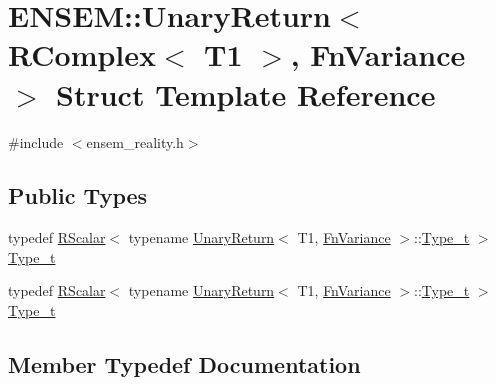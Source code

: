 \hypertarget{structENSEM_1_1UnaryReturn_3_01RComplex_3_01T1_01_4_00_01FnVariance_01_4}{}\section{E\+N\+S\+EM\+:\+:Unary\+Return$<$ R\+Complex$<$ T1 $>$, Fn\+Variance $>$ Struct Template Reference}
\label{structENSEM_1_1UnaryReturn_3_01RComplex_3_01T1_01_4_00_01FnVariance_01_4}


{\ttfamily \#include $<$ensem\+\_\+reality.\+h$>$}

\subsection*{Public Types}
\begin{DoxyCompactItemize}
\item 
typedef \mbox{\hyperlink{classENSEM_1_1RScalar}{R\+Scalar}}$<$ typename \mbox{\hyperlink{structENSEM_1_1UnaryReturn}{Unary\+Return}}$<$ T1, \mbox{\hyperlink{structENSEM_1_1FnVariance}{Fn\+Variance}} $>$\+::\mbox{\hyperlink{structENSEM_1_1UnaryReturn_3_01RComplex_3_01T1_01_4_00_01FnVariance_01_4_a85d25582f2c509cb70b5b53ff50ee7ce}{Type\+\_\+t}} $>$ \mbox{\hyperlink{structENSEM_1_1UnaryReturn_3_01RComplex_3_01T1_01_4_00_01FnVariance_01_4_a85d25582f2c509cb70b5b53ff50ee7ce}{Type\+\_\+t}}
\item 
typedef \mbox{\hyperlink{classENSEM_1_1RScalar}{R\+Scalar}}$<$ typename \mbox{\hyperlink{structENSEM_1_1UnaryReturn}{Unary\+Return}}$<$ T1, \mbox{\hyperlink{structENSEM_1_1FnVariance}{Fn\+Variance}} $>$\+::\mbox{\hyperlink{structENSEM_1_1UnaryReturn_3_01RComplex_3_01T1_01_4_00_01FnVariance_01_4_a85d25582f2c509cb70b5b53ff50ee7ce}{Type\+\_\+t}} $>$ \mbox{\hyperlink{structENSEM_1_1UnaryReturn_3_01RComplex_3_01T1_01_4_00_01FnVariance_01_4_a85d25582f2c509cb70b5b53ff50ee7ce}{Type\+\_\+t}}
\end{DoxyCompactItemize}


\subsection{Member Typedef Documentation}
\mbox{\label{structENSEM_1_1UnaryReturn_3_01RComplex_3_01T1_01_4_00_01FnVariance_01_4_a85d25582f2c509cb70b5b53ff50ee7ce}} 
